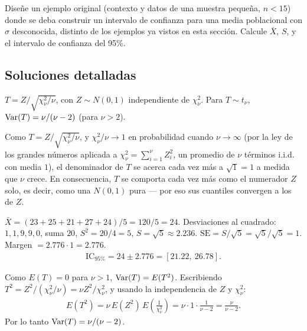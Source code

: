 \begin{problema}
	\label{prob:c34507c}
	Diseñe un ejemplo original (contexto y datos de una muestra pequeña, $n<15$) donde se deba construir un intervalo de confianza para una media poblacional con $\sigma$ desconocida, distinto de los ejemplos ya vistos en esta sección. Calcule $\bar X$, $S$, y el intervalo de confianza del 95\%.
\end{problema}

\subsection*{Soluciones detalladas}

\begin{solproblema}[prob:3de3320]
	$T = Z/\sqrt{\chi^2_\nu/\nu}$, con $Z\sim N(0,1)$ independiente de $\chi^2_\nu$. Para $T\sim t_\nu$, $\operatorname{Var}(T) = \nu/(\nu-2)$ (para $\nu>2$).
\end{solproblema}

\begin{solproblema}
	Como $T = Z/\sqrt{\chi^2_\nu/\nu}$, y $\chi^2_\nu/\nu \to 1$ en probabilidad cuando $\nu\to\infty$ (por la ley de los grandes números aplicada a $\chi^2_\nu = \sum_{i=1}^\nu Z_i^2$, un promedio de $\nu$ términos i.i.d. con media $1$), el denominador de $T$ se acerca cada vez más a $\sqrt{1}=1$ a medida que $\nu$ crece. En consecuencia, $T$ se comporta cada vez más como el numerador $Z$ solo, es decir, como una $N(0,1)$ pura — por eso sus cuantiles convergen a los de $Z$.
\end{solproblema}

\begin{solproblema}[prob:e378132]
	$\bar X = (23+25+21+27+24)/5 = 120/5 = 24$. Desviaciones al cuadrado: $1,1,9,9,0$, suma $20$, $S^2=20/4=5$, $S=\sqrt5\approx2.236$. $\text{SE}=S/\sqrt5=\sqrt5/\sqrt5=1$. Margen $=2.776\cdot1=2.776$.
	\begin{align*}
		\text{IC}_{95\%} = 24 \pm 2.776 = [21.22,\ 26.78].
	\end{align*}
\end{solproblema}

\begin{solproblema}[prob:7943b46]
	Como $E(T)=0$ para $\nu>1$, $\operatorname{Var}(T)=E(T^2)$. Escribiendo $T^2 = Z^2/(\chi^2_\nu/\nu) = \nu Z^2/\chi^2_\nu$, y usando la independencia de $Z$ y $\chi^2_\nu$:
	\begin{align*}
		E(T^2) = \nu\,E(Z^2)\,E\!\left(\frac{1}{\chi^2_\nu}\right) = \nu\cdot1\cdot\frac{1}{\nu-2} = \frac{\nu}{\nu-2}.
	\end{align*}
	Por lo tanto $\operatorname{Var}(T) = \nu/(\nu-2)$.
\end{solproblema}

